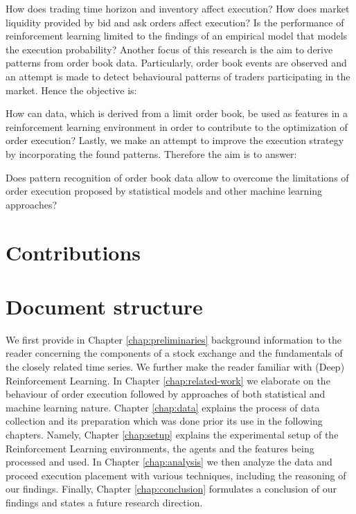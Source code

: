 How does trading time horizon and inventory affect execution?
How does market liquidity provided by bid and ask orders affect execution?
Is the performance of reinforcement learning limited to the findings of an empirical model that models the execution probability?
Another focus of this research is the aim to derive patterns from order book data. Particularly, order book events are observed and an attempt is made to detect behavioural patterns of traders participating in the market. Hence the objective is:

How can data, which is derived from a limit order book, be used as features in a reinforcement learning environment in order to contribute to the optimization of order execution?
Lastly, we make an attempt to improve the execution strategy by incorporating the found patterns. Therefore the aim is to answer:

Does pattern recognition of order book data allow to overcome the limitations of order execution proposed by statistical models and other machine learning approaches?


\section{Contributions}

\section{Document structure}

We first provide in Chapter \ref{chap:preliminaries} background information to the reader concerning the components of a stock exchange and the fundamentals of the closely related time series.
We further make the reader familiar with (Deep) Reinforcement Learning.
In Chapter \ref{chap:related-work} we elaborate on the behaviour of order execution followed by approaches of both statistical and machine learning nature.
Chapter \ref{chap:data} explains the process of data collection and its preparation which was done prior its use in the following chapters.
Namely, Chapter \ref{chap:setup} explains the experimental setup of the Reinforcement Learning environments, the agents and the features being processed and used.
In Chapter \ref{chap:analysis} we then analyze the data and proceed execution placement with various techniques, including the reasoning of our findings.
Finally, Chapter \ref{chap:conclusion} formulates a conclusion of our findings and states a future research direction.
